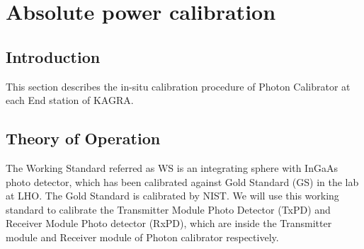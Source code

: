 
\chapter{Absolute power calibration} %
\label{Chapter6} %
\section{Introduction}
\label{sec:intro}
This section describes the in-situ calibration procedure of Photon Calibrator at each End station of KAGRA.

\section{Theory of Operation}

The Working Standard referred as WS  is an integrating sphere with InGaAs photo detector, which has been calibrated against Gold Standard (GS) in the lab at LHO. The Gold Standard is calibrated by NIST. We will use this working standard to calibrate the Transmitter Module Photo Detector (TxPD) and Receiver Module Photo detector (RxPD), which are inside the Transmitter module and Receiver module of Photon calibrator respectively.

